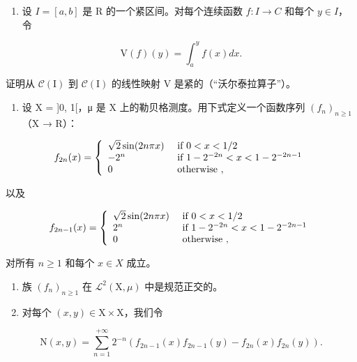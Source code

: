 \exercisesection{}

\begin{enumerate}
\def\labelenumi{\arabic{enumi})}
\tightlist
\item
  设 \(I = [a, b]\) 是 R 的一个紧区间。对每个连续函数 \(f: I \to C\) 和每个 \(y \in I\)，令
\end{enumerate}

\[
\mathrm{V} (f) (y) = \int_ {a} ^ {y} f (x) d x.
\]

证明从 \(\mathcal{C}(\mathrm{I})\) 到 \(\mathcal{C}(\mathrm{I})\) 的线性映射 V 是紧的（“沃尔泰拉算子”）。

\begin{enumerate}
\def\labelenumi{\arabic{enumi})}
\setcounter{enumi}{1}
\tightlist
\item
  设 X = {]}0, 1{[}，μ 是 X 上的勒贝格测度。用下式定义一个函数序列 \((f_{n})_{n \geqslant 1}\)（X → R）：
\end{enumerate}

\[
f _ {2 n} (x) = \left\{ \begin{array}{l l} \sqrt {2} \sin (2 n \pi x) & \text { if } 0 <   x <   1 / 2 \\ - 2 ^ {n} & \text { if } 1 - 2 ^ {- 2 n} <   x <   1 - 2 ^ {- 2 n - 1} \\ 0 & \text { otherwise }, \end{array} \right.
\]

以及

\[
f _ {2 n - 1} (x) = \left\{ \begin{array}{l l} \sqrt {2} \sin (2 n \pi x) & \text { if } 0 <   x <   1 / 2 \\ 2 ^ {n} & \text { if } 1 - 2 ^ {- 2 n} <   x <   1 - 2 ^ {- 2 n - 1} \\ 0 & \text { otherwise }, \end{array} \right.
\]

对所有 \(n \geqslant 1\) 和每个 \(x \in X\) 成立。

\begin{enumerate}
\def\labelenumi{\alph{enumi})}
\item
  族 \((f_n)_{n\geqslant 1}\) 在 \(\mathcal{L}^2 (\mathrm{X},\mu)\) 中是规范正交的。
\item
  对每个 \((x,y)\in \mathrm{X}\times \mathrm{X}\)，我们令
\end{enumerate}

\[
\mathrm{N} (x, y) = \sum_ {n = 1} ^ {+ \infty} 2 ^ {- n} (f _ {2 n - 1} (x) f _ {2 n - 1} (y) - f _ {2 n} (x) f _ {2 n} (y)).
\]

